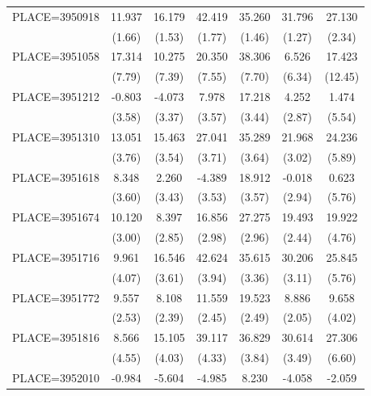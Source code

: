 {\begin{tabular}{l*{6}{c}}
PLACE=3950918       &      11.937&      16.179&      42.419&      35.260&      31.796&      27.130\\
                    &      (1.66)&      (1.53)&      (1.77)&      (1.46)&      (1.27)&      (2.34)\\
PLACE=3951058       &      17.314&      10.275&      20.350&      38.306&       6.526&      17.423\\
                    &      (7.79)&      (7.39)&      (7.55)&      (7.70)&      (6.34)&     (12.45)\\
PLACE=3951212       &      -0.803&      -4.073&       7.978&      17.218&       4.252&       1.474\\
                    &      (3.58)&      (3.37)&      (3.57)&      (3.44)&      (2.87)&      (5.54)\\
PLACE=3951310       &      13.051&      15.463&      27.041&      35.289&      21.968&      24.236\\
                    &      (3.76)&      (3.54)&      (3.71)&      (3.64)&      (3.02)&      (5.89)\\
PLACE=3951618       &       8.348&       2.260&      -4.389&      18.912&      -0.018&       0.623\\
                    &      (3.60)&      (3.43)&      (3.53)&      (3.57)&      (2.94)&      (5.76)\\
PLACE=3951674       &      10.120&       8.397&      16.856&      27.275&      19.493&      19.922\\
                    &      (3.00)&      (2.85)&      (2.98)&      (2.96)&      (2.44)&      (4.76)\\
PLACE=3951716       &       9.961&      16.546&      42.624&      35.615&      30.206&      25.845\\
                    &      (4.07)&      (3.61)&      (3.94)&      (3.36)&      (3.11)&      (5.76)\\
PLACE=3951772       &       9.557&       8.108&      11.559&      19.523&       8.886&       9.658\\
                    &      (2.53)&      (2.39)&      (2.45)&      (2.49)&      (2.05)&      (4.02)\\
PLACE=3951816       &       8.566&      15.105&      39.117&      36.829&      30.614&      27.306\\
                    &      (4.55)&      (4.03)&      (4.33)&      (3.84)&      (3.49)&      (6.60)\\
PLACE=3952010       &      -0.984&      -5.604&      -4.985&       8.230&      -4.058&      -2.059\\

\end{tabular}}
